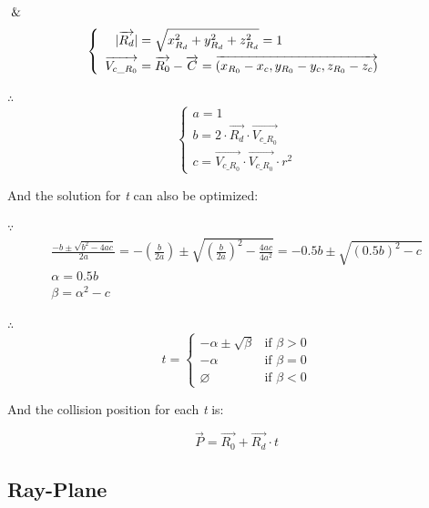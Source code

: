 $\And$
\[
\left\{
\begin{array}{lr}
\begin{aligned}
\lvert \overrightarrow{R_d} \rvert &= \sqrt{x_{R_d}^2 + y_{R_d}^2 + z_{R_d}^2} = 1 \\
\overrightarrow{V_{c\_R_0}} &= \overrightarrow{R_0} - \overrightarrow{C} = \overrightarrow{(x_{R_0} - x_c, y_{R_0} - y_c, z_{R_0} - z_c)}
\end{aligned}
\end{array}
\right.
\]

$\therefore$
\[
\left\{
\begin{array}{lr}
a =1 \\
b = 2 \cdot \overrightarrow{R_d} \cdot \overrightarrow{V_{c\_R_0}} \\
c = \overrightarrow{V_{c\_R_0}} \cdot \overrightarrow{V_{c\_R_0}} \cdot r^2
\end{array}
\right.
\]

And the solution for \emph{t} can also be optimized:

$\because$
\[
\begin{array}{lr}
\frac{-b \pm \sqrt{b^2 - 4ac}}{2a} = -(\frac{b}{2a}) \pm \sqrt{(\frac{b}{2a})^2 - \frac{4ac}{4a^2}} = -0.5b \pm \sqrt{(0.5b)^2 - c} \\
\alpha = 0.5b \\
\beta = \alpha^2 - c
\end{array}
\]

$\therefore$
\[
t =
\begin{cases}
 -\alpha \pm \sqrt{\beta} & \text{if } \beta > 0 \\
-\alpha & \text{if } \beta = 0 \\
\varnothing & \text{if } \beta < 0
\end{cases}
\]

And the collision position for each \emph{t} is:

\[
\overrightarrow{P} = \overrightarrow{R_0} + \overrightarrow{R_d} \cdot t
\]

\subsection{Ray-Plane}

